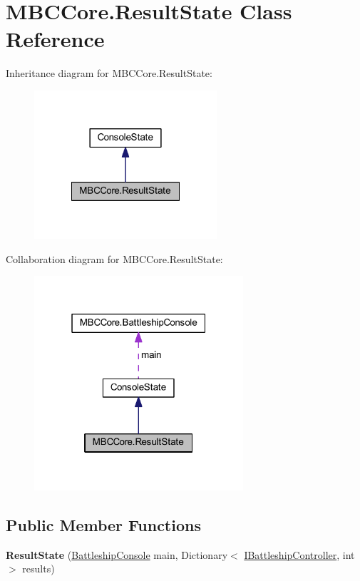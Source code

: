 \hypertarget{class_m_b_c_core_1_1_result_state}{\section{M\-B\-C\-Core.\-Result\-State Class Reference}
\label{class_m_b_c_core_1_1_result_state}
}


Inheritance diagram for M\-B\-C\-Core.\-Result\-State\-:\nopagebreak
\begin{figure}[H]
\begin{center}
\leavevmode
\includegraphics[width=192pt]{class_m_b_c_core_1_1_result_state__inherit__graph}
\end{center}
\end{figure}


Collaboration diagram for M\-B\-C\-Core.\-Result\-State\-:\nopagebreak
\begin{figure}[H]
\begin{center}
\leavevmode
\includegraphics[width=220pt]{class_m_b_c_core_1_1_result_state__coll__graph}
\end{center}
\end{figure}
\subsection*{Public Member Functions}
\begin{DoxyCompactItemize}
\item 
\hypertarget{class_m_b_c_core_1_1_result_state_ad90629e501dd53c2643970d28ec8c27d}{{\bfseries Result\-State} (\hyperlink{class_m_b_c_core_1_1_battleship_console}{Battleship\-Console} main, Dictionary$<$ \hyperlink{interface_m_b_c_core_1_1_i_battleship_controller}{I\-Battleship\-Controller}, int $>$ results)}\label{class_m_b_c_core_1_1_result_state_ad90629e501dd53c2643970d28ec8c27d}

\end{DoxyCompactItemize}
